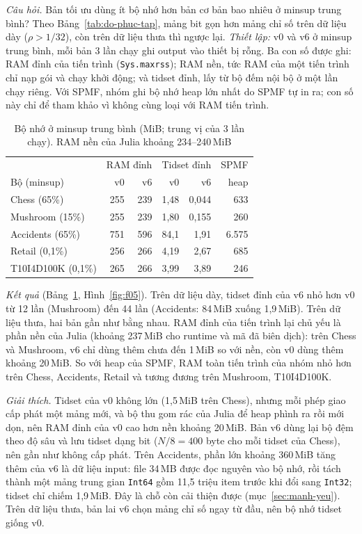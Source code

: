 \emph{Câu hỏi.} Bản tối ưu dùng ít bộ nhớ hơn bản cơ bản bao nhiêu ở minsup trung bình? Theo Bảng~\ref{tab:do-phuc-tap}, mảng bit gọn hơn mảng chỉ số trên dữ liệu dày ($\rho > 1/32$), còn trên dữ liệu thưa thì ngược lại. \emph{Thiết lập:} v0 và v6 ở minsup trung bình, mỗi bản 3 lần chạy ghi output vào thiết bị rỗng. Ba con số được ghi: RAM đỉnh của tiến trình (\texttt{Sys.maxrss}); RAM nền, tức RAM của một tiến trình chỉ nạp gói và chạy khởi động; và tidset đỉnh, lấy từ bộ đếm nội bộ ở một lần chạy riêng. Với SPMF, nhóm ghi bộ nhớ heap lớn nhất do SPMF tự in ra; con số này chỉ để tham khảo vì không cùng loại với RAM tiến trình.

\begin{table}[t]
\caption{Bộ nhớ ở minsup trung bình (MiB; trung vị của 3 lần chạy). RAM nền của Julia khoảng 234--240\,MiB}
\label{tab:e4}
\centering
\footnotesize
\setlength{\tabcolsep}{3pt}
\begin{tabular}{@{}lrrrrr@{}}
\toprule
& \multicolumn{2}{c}{RAM đỉnh} & \multicolumn{2}{c}{Tidset đỉnh} & SPMF \\
Bộ (minsup) & v0 & v6 & v0 & v6 & heap \\
\midrule
Chess (65\%) & 255 & 239 & 1,48 & 0,044 & 633 \\
Mushroom (15\%) & 255 & 239 & 1,80 & 0,155 & 260 \\
Accidents (65\%) & 751 & 596 & 84,1 & 1,91 & 6.575 \\
Retail (0,1\%) & 256 & 266 & 4,19 & 2,67 & 685 \\
T10I4D100K (0,1\%) & 265 & 266 & 3,99 & 3,89 & 246 \\
\bottomrule
\end{tabular}
\end{table}

\emph{Kết quả} (Bảng~\ref{tab:e4}, Hình~\ref{fig:f05}). Trên dữ liệu dày, tidset đỉnh của v6 nhỏ hơn v0 từ 12 lần (Mushroom) đến 44 lần (Accidents: 84\,MiB xuống 1,9\,MiB). Trên dữ liệu thưa, hai bản gần như bằng nhau. RAM đỉnh của tiến trình lại chủ yếu là phần nền của Julia (khoảng 237\,MiB cho runtime và mã đã biên dịch): trên Chess và Mushroom, v6 chỉ dùng thêm chưa đến 1\,MiB so với nền, còn v0 dùng thêm khoảng 20\,MiB. So với heap của SPMF, RAM toàn tiến trình của nhóm nhỏ hơn trên Chess, Accidents, Retail và tương đương trên Mushroom, T10I4D100K.

\emph{Giải thích.} Tidset của v0 không lớn (1,5\,MiB trên Chess), nhưng mỗi phép giao cấp phát một mảng mới, và bộ thu gom rác của Julia để heap phình ra rồi mới dọn, nên RAM đỉnh của v0 cao hơn nền khoảng 20\,MiB. Bản v6 dùng lại bộ đệm theo độ sâu và lưu tidset dạng bit ($N/8 = 400$ byte cho mỗi tidset của Chess), nên gần như không cấp phát. Trên Accidents, phần lớn khoảng 360\,MiB tăng thêm của v6 là dữ liệu input: file 34\,MB được đọc nguyên vào bộ nhớ, rồi tách thành một mảng trung gian \texttt{Int64} gồm 11,5 triệu item trước khi đổi sang \texttt{Int32}; tidset chỉ chiếm 1,9\,MiB. Đây là chỗ còn cải thiện được (mục~\ref{sec:manh-yeu}). Trên dữ liệu thưa, bản lai v6 chọn mảng chỉ số ngay từ đầu, nên bộ nhớ tidset giống v0.

